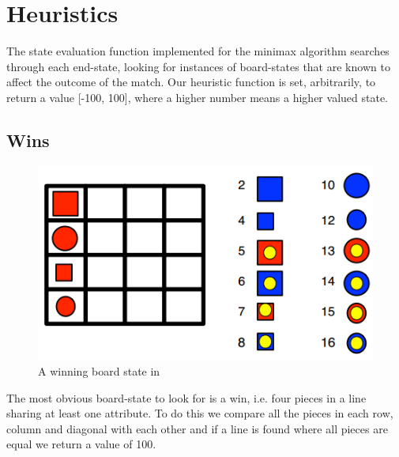\section{Heuristics}\label{heuristics}
The state evaluation function implemented for the minimax algorithm searches 
through each end-state, looking for instances of board-states that are known  
to affect the outcome of the match.
Our heuristic function is set, arbitrarily, to return a value [-100, 100], 
where a higher number means a higher valued state.

\subsection{Wins}
\begin{figure}[htb]
\label{fig: win}
\includegraphics{pictures/win.png}
\caption[A \quarto{} win]{A winning board state in \quarto{}}
\end{figure}
The most obvious board-state to look for is a win, i.e. four pieces in a line  
sharing at least one attribute. To do this we compare all the pieces in each 
row, column and diagonal with each other and if a line is found where all 
pieces are equal we return a value of 100.

